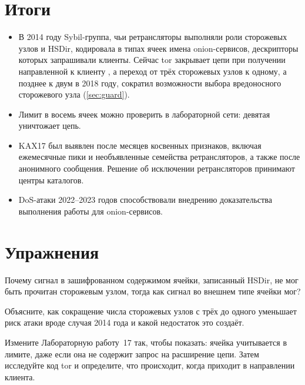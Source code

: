 \section*{Итоги}
\begin{itemize}
  \item В 2014 году Sybil-группа, чьи ретрансляторы выполняли роли сторожевых узлов и HSDir, кодировала в типах ячеек имена onion-сервисов, дескрипторы которых запрашивали клиенты. Сейчас tor закрывает цепи при получении направленной к клиенту , а переход от трёх сторожевых узлов к одному, а позднее к двум в 2018 году, сократил возможности выбора вредоносного сторожевого узла (\cref{sec:guard}).
  \item Лимит в восемь ячеек  можно проверить в лабораторной сети: девятая уничтожает цепь.
  \item KAX17 был выявлен после месяцев косвенных признаков, включая ежемесячные пики и необъявленные семейства ретрансляторов, а также после анонимного сообщения. Решение об исключении ретрансляторов принимают центры каталогов.
  \item DoS-атаки 2022--2023 годов способствовали внедрению доказательства выполнения работы для onion-сервисов.
\end{itemize}

\section*{Упражнения}

\begin{esercizio}[1]\label{es:27-campo}
Почему сигнал в зашифрованном содержимом ячейки, записанный HSDir, не мог быть прочитан сторожевым узлом, тогда как сигнал во внешнем типе ячейки мог?
\end{esercizio}

\begin{esercizio}[1]\label{es:27-uno}
Объясните, как сокращение числа сторожевых узлов с трёх до одного уменьшает риск атаки вроде случая 2014 года и какой недостаток это создаёт.
\end{esercizio}

\begin{esercizio}[2]\label{es:27-verso}
Измените Лабораторную работу~17 так, чтобы показать: ячейка  учитывается в лимите, даже если она не содержит запрос на расширение цепи. Затем исследуйте код tor и определите, что происходит, когда  приходит в направлении клиента.
\end{esercizio}

